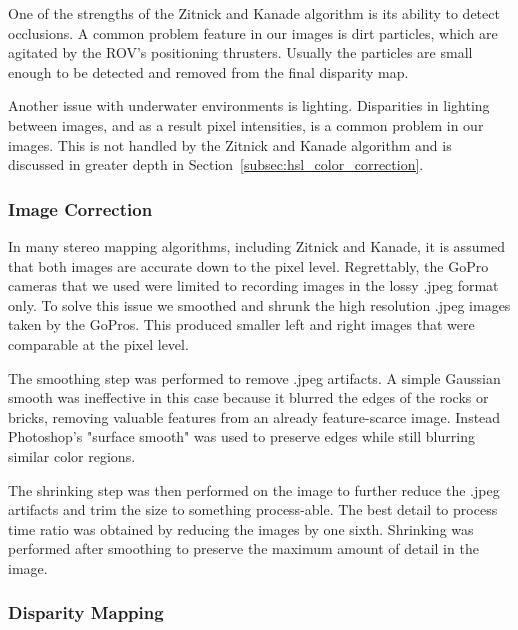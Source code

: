 \documentclass[a4paper,twoside]{article}
\begin{document}
One of the strengths of the Zitnick and Kanade algorithm is its ability to detect occlusions.  
A common problem feature in our images is dirt particles, which are agitated by the ROV's positioning thrusters.
Usually the particles are small enough to be detected and removed from the final disparity map.

Another issue with underwater environments is lighting.
  Disparities in lighting between images, and as a result pixel intensities, is a common problem in our images.  
This is not handled by the Zitnick and Kanade algorithm and is discussed in greater depth in Section~\ref{subsec:hsl_color_correction}.


\subsubsection{Image Correction}
\label{subsec:image_correction}

In many stereo mapping algorithms, including Zitnick and Kanade, it is assumed that both images are accurate down to the pixel level.
Regrettably, the GoPro cameras that we used were limited to recording images in the lossy .jpeg format only.
To solve this issue we smoothed and shrunk the high resolution .jpeg images taken by the GoPros. 
This produced smaller left and right images that were comparable at the pixel level.

The smoothing step was performed to remove .jpeg artifacts.
  A simple Gaussian smooth was ineffective in this case because it blurred the edges of the rocks or bricks, removing valuable features from an already feature-scarce image.
  Instead Photoshop's "surface smooth" was used to preserve edges while still blurring similar color regions.

The shrinking step was then performed on the image to further reduce the .jpeg artifacts and trim the size to something process-able.  
The best detail to process time ratio was obtained by reducing the images by one sixth.   
Shrinking was performed after smoothing to preserve the maximum amount of detail in the image.  


\subsubsection{Disparity Mapping}
\label{subsec:disparity_mapping}
\end{document}
